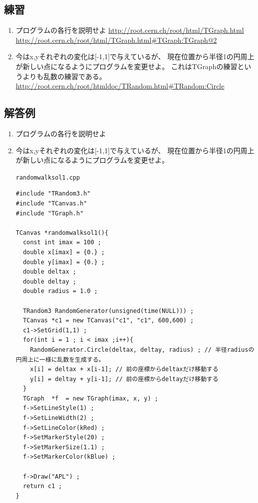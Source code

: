 \documentclass{jarticle}
\begin{document}
\subsection{練習}
\begin{enumerate}
 \item プログラムの各行を説明せよ
       \url{http://root.cern.ch/root/html/TGraph.html}
       \url{http://root.cern.ch/root/html/TGraph.html#TGraph:TGraph@2}
 \item 今はx,yそれぞれの変化は[-1,1]で与えているが、
       現在位置から半径1の円周上が新しい点になるようにプログラムを変更せよ。
       これはTGraphの練習というよりも乱数の練習である。
       \url{http://root.cern.ch/root/htmldoc/TRandom.html#TRandom:Circle}
\end{enumerate}

\subsection{解答例}

\begin{enumerate}
 \item プログラムの各行を説明せよ
 \item 今はx,yそれぞれの変化は[-1,1]で与えているが、
       現在位置から半径1の円周上が新しい点になるようにプログラムを変更せよ。
       \begin{itembox}{\texttt{randomwalksol1.cpp}}
\begin{verbatim}
#include "TRandom3.h"
#include "TCanvas.h"
#include "TGraph.h"

TCanvas *randomwalksol1(){
  const int imax = 100 ;
  double x[imax] = {0.} ;
  double y[imax] = {0.} ;
  double deltax ;
  double deltay ;
  double radius = 1.0 ;
  
  TRandom3 RandomGenerator(unsigned(time(NULL))) ;
  TCanvas *c1 = new TCanvas("c1", "c1", 600,600) ;
  c1->SetGrid(1,1) ;  
  for(int i = 1 ; i < imax ;i++){
    RandomGenerator.Circle(deltax, deltay, radius) ; // 半径radiusの円周上に一様に乱数を生成する。
    x[i] = deltax + x[i-1]; // 前の座標からdeltaxだけ移動する
    y[i] = deltay + y[i-1]; // 前の座標からdeltayだけ移動する
  }
  TGraph  *f  = new TGraph(imax, x, y) ;
  f->SetLineStyle(1) ;
  f->SetLineWidth(2) ;
  f->SetLineColor(kRed) ;
  f->SetMarkerStyle(20) ;
  f->SetMarkerSize(1.1) ;
  f->SetMarkerColor(kBlue) ;

  f->Draw("APL") ;
  return c1 ;
}

\end{verbatim}
       \end{itembox}

\end{enumerate}
\end{document}
